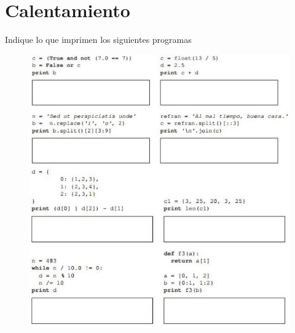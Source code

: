 \section{Calentamiento}
Indique lo que imprimen los siguientes programas
\begin{figure}[h]
    \centering
    \includegraphics[scale=1.2]{Imagenes/progra1.jpg}
\end{figure}